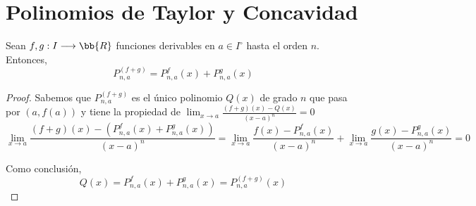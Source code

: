 \section{Polinomios de Taylor y Concavidad}

\begin{teo*}
    Sean $f,g:I\longrightarrow \bb{R}$ funciones derivables en $a\in I^\circ$ hasta el orden $n$. Entonces,
    \begin{equation*}
        P_{n,a}^{(f+g)} = P_{n,a}^{f}(x) + P_{n,a}^{g}(x)
    \end{equation*}
\end{teo*}

\begin{proof}
    Sabemos que $P_{n,a}^{(f+g)}$ es el único polinomio $Q(x)$ de grado $n$ que pasa por $(a,f(a))$ y tiene la propiedad de $\lim_{x\to a} \frac{(f+g)(x) - Q(x)}{(x-a)^n} = 0$
    \begin{equation*}
        \lim_{x\to a} \frac{(f+g)(x) - (P_{n,a}^{f}(x) + P_{n,a}^{g}(x))}{(x-a)^n} = \lim_{x\to a} \frac{f(x) - P_{n,a}^{f}(x)}{(x-a)^n} + \lim_{x\to a} \frac{g(x) - P_{n,a}^{g}(x)}{(x-a)^n} = 0
    \end{equation*}

    Como conclusión,
    $$Q(x) = P_{n,a}^{f}(x) + P_{n,a}^{g}(x) = P_{n,a}^{(f+g)}(x)$$
\end{proof}



